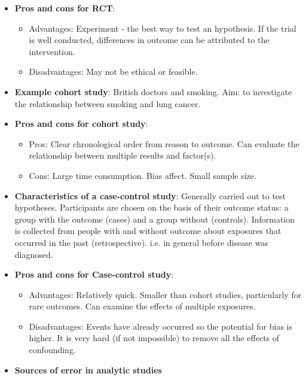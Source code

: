 \documentclass[12pt]{book}
\begin{document}
\begin{itemize}
\item \textbf{Pros and cons for RCT}:
    \begin{itemize}
    \item Advantages: Experiment - the best way to test an hypothesis. If the trial is well conducted, differences in outcome can be attributed to the intervention.
    \item Disadvantages: May not be ethical or feasible.
    \end{itemize}
\item \textbf{Example cohort study}: British doctors and smoking. Aim: to investigate the relationship between smoking and lung cancer.
\item \textbf{Pros and cons for cohort study}:
    \begin{itemize}
    \item Pros: Clear chronological order from reason to outcome. Can evaluate the relationship between multiple results and factor(s).
    \item Cons: Large time consumption. Bias affect. Small sample size.
    \end{itemize}
\item \textbf{Characteristics of a case-control study}: Generally carried out to test hypotheses. Participants are chosen on the basis of their outcome status: a group with the outcome (cases) and a group without (controls). Information is collected from people with and without outcome about exposures that occurred in the past (retrospective). i.e. in general before disease was diagnosed.
\item \textbf{Pros and cons for Case-control study}:
    \begin{itemize}
    \item Advantages: Relatively quick. Smaller than cohort studies, particularly for rare outcomes. Can examine the effects of multiple exposures.
    \item Disadvantages: Events have already occurred so the potential for bias is higher. It is very hard (if not impossible) to remove all the effects of confounding.
    \end{itemize}
\item \textbf{Sources of error in analytic studies}


\end{itemize}
\end{document}
